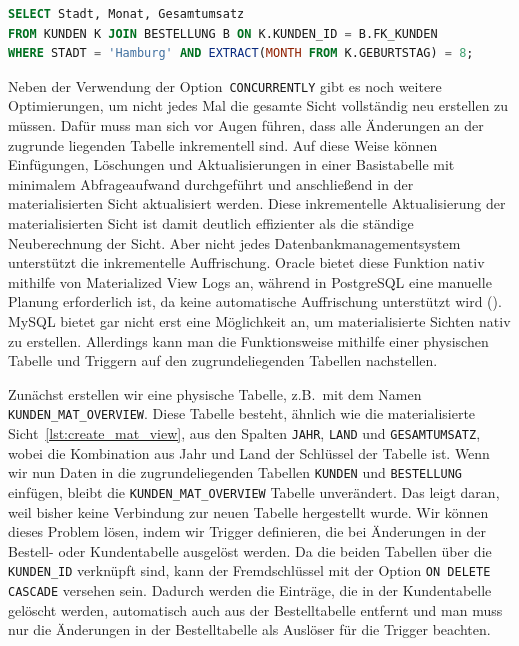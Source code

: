 \vspace{-5pt}
\begin{lstlisting}[language=SQL,caption=Select nicht für View,label={lst:select-without-mat-view}]
SELECT Stadt, Monat, Gesamtumsatz
FROM KUNDEN K JOIN BESTELLUNG B ON K.KUNDEN_ID = B.FK_KUNDEN
WHERE STADT = 'Hamburg' AND EXTRACT(MONTH FROM K.GEBURTSTAG) = 8;
\end{lstlisting}
\vspace{-5pt}

Neben der Verwendung der Option~\texttt{CONCURRENTLY} gibt es noch weitere Optimierungen, um nicht jedes Mal die gesamte Sicht vollständig neu erstellen zu müssen.
Dafür muss man sich vor Augen führen, dass alle Änderungen an der zugrunde liegenden Tabelle inkrementell sind.
Auf diese Weise können Einfügungen, Löschungen und Aktualisierungen in einer Basistabelle mit minimalem Abfrageaufwand durchgeführt und anschließend in der materialisierten Sicht aktualisiert werden.
Diese inkrementelle Aktualisierung der materialisierten Sicht ist damit deutlich effizienter als die ständige Neuberechnung der Sicht.
Aber nicht jedes Datenbankmanagementsystem unterstützt die inkrementelle Auffrischung.
Oracle bietet diese Funktion nativ mithilfe von Materialized View Logs an, während in PostgreSQL eine manuelle Planung erforderlich ist, da keine automatische Auffrischung unterstützt wird (\cite{mat_view_features_per_db}).
MySQL bietet gar nicht erst eine Möglichkeit an, um materialisierte Sichten nativ zu erstellen.
Allerdings kann man die Funktionsweise mithilfe einer physischen Tabelle und Triggern auf den zugrundeliegenden Tabellen nachstellen.

Zunächst erstellen wir eine physische Tabelle, z.B.\ mit dem Namen \texttt{KUNDEN\_MAT\_OVERVIEW}.
Diese Tabelle besteht, ähnlich wie die materialisierte Sicht~\ref{lst:create_mat_view}, aus den Spalten \texttt{JAHR}, \texttt{LAND} und \texttt{GESAMTUMSATZ}, wobei die Kombination aus Jahr und Land der Schlüssel der Tabelle ist.
Wenn wir nun Daten in die zugrundeliegenden Tabellen \texttt{KUNDEN} und \texttt{BESTELLUNG} einfügen, bleibt die \texttt{KUNDEN\_MAT\_OVERVIEW} Tabelle unverändert.
Das leigt daran, weil bisher keine Verbindung zur neuen Tabelle hergestellt wurde.
Wir können dieses Problem lösen, indem wir Trigger definieren, die bei Änderungen in der Bestell- oder Kundentabelle ausgelöst werden.
Da die beiden Tabellen über die \texttt{KUNDEN\_ID} verknüpft sind, kann der Fremdschlüssel mit der Option \texttt{ON DELETE CASCADE} versehen sein.
Dadurch werden die Einträge, die in der Kundentabelle gelöscht werden, automatisch auch aus der Bestelltabelle entfernt und man muss nur die Änderungen in der Bestelltabelle als Auslöser für die Trigger beachten.

